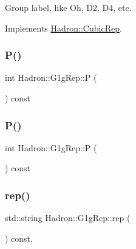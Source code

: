 Group label, like Oh, D2, D4, etc. 

Implements \mbox{\hyperlink{structHadron_1_1CubicRep_a0748f11ec87f387062c8e8981339a29c}{Hadron\+::\+Cubic\+Rep}}.

\mbox{\label{structHadron_1_1G1gRep_ad61e2bd6d4def56365662d7108262ffb}} 
\subsubsection{\texorpdfstring{P()}{P()}\hspace{0.1cm}{\footnotesize\ttfamily [1/2]}}
{\footnotesize\ttfamily int Hadron\+::\+G1g\+Rep\+::P (\begin{DoxyParamCaption}{ }\end{DoxyParamCaption}) const\hspace{0.3cm}{\ttfamily [inline]}}

\mbox{\label{structHadron_1_1G1gRep_ad61e2bd6d4def56365662d7108262ffb}} 
\subsubsection{\texorpdfstring{P()}{P()}\hspace{0.1cm}{\footnotesize\ttfamily [2/2]}}
{\footnotesize\ttfamily int Hadron\+::\+G1g\+Rep\+::P (\begin{DoxyParamCaption}{ }\end{DoxyParamCaption}) const\hspace{0.3cm}{\ttfamily [inline]}}

\mbox{\label{structHadron_1_1G1gRep_ad03cbfd3310a65b26937f01ebaa044dd}} 
\subsubsection{\texorpdfstring{rep()}{rep()}\hspace{0.1cm}{\footnotesize\ttfamily [1/5]}}
{\footnotesize\ttfamily std\+::string Hadron\+::\+G1g\+Rep\+::rep (\begin{DoxyParamCaption}{ }\end{DoxyParamCaption}) const\hspace{0.3cm}{\ttfamily [inline]}, {\ttfamily [virtual]}}



